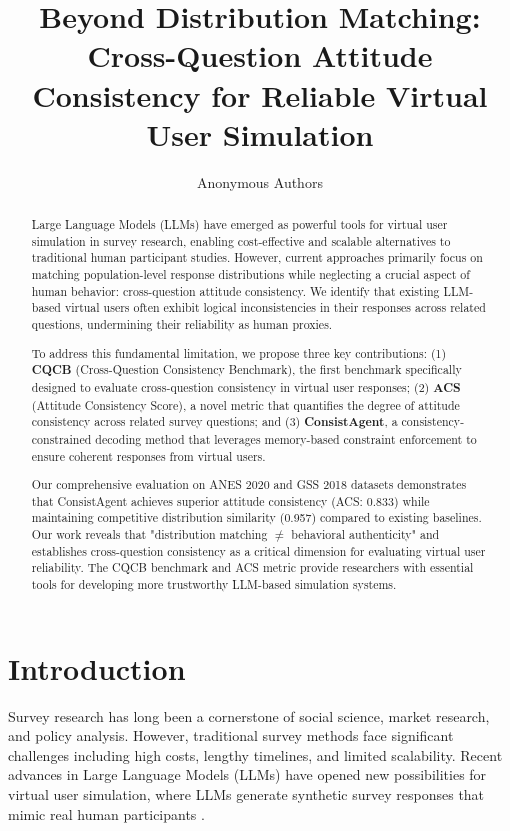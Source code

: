 \documentclass{article}
\title{Beyond Distribution Matching: Cross-Question Attitude Consistency for Reliable Virtual User Simulation}
\author{Anonymous Authors}
\date{}
\begin{document}
\maketitle

\begin{abstract}
Large Language Models (LLMs) have emerged as powerful tools for virtual user simulation in survey research, enabling cost-effective and scalable alternatives to traditional human participant studies. However, current approaches primarily focus on matching population-level response distributions while neglecting a crucial aspect of human behavior: cross-question attitude consistency. We identify that existing LLM-based virtual users often exhibit logical inconsistencies in their responses across related questions, undermining their reliability as human proxies.

To address this fundamental limitation, we propose three key contributions: (1) \textbf{CQCB} (Cross-Question Consistency Benchmark), the first benchmark specifically designed to evaluate cross-question consistency in virtual user responses; (2) \textbf{ACS} (Attitude Consistency Score), a novel metric that quantifies the degree of attitude consistency across related survey questions; and (3) \textbf{ConsistAgent}, a consistency-constrained decoding method that leverages memory-based constraint enforcement to ensure coherent responses from virtual users.

Our comprehensive evaluation on ANES 2020 and GSS 2018 datasets demonstrates that ConsistAgent achieves superior attitude consistency (ACS: 0.833) while maintaining competitive distribution similarity (0.957) compared to existing baselines. Our work reveals that "distribution matching $\neq$ behavioral authenticity" and establishes cross-question consistency as a critical dimension for evaluating virtual user reliability. The CQCB benchmark and ACS metric provide researchers with essential tools for developing more trustworthy LLM-based simulation systems.
\end{abstract}

\section{Introduction}

Survey research has long been a cornerstone of social science, market research, and policy analysis. However, traditional survey methods face significant challenges including high costs, lengthy timelines, and limited scalability. Recent advances in Large Language Models (LLMs) have opened new possibilities for virtual user simulation, where LLMs generate synthetic survey responses that mimic real human participants \cite{park2023generative, chen2025polypersona, wang2025large}.
\end{document}
